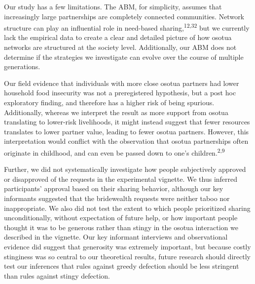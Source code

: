 \documentclass[
]{article}
\begin{document}
Our study has a few limitations. The ABM, for simplicity, assumes that increasingly large partnerships are completely connected communities. Network structure can play an influential role in need-based sharing,\textsuperscript{12,32} but we currently lack the empirical data to create a clear and detailed picture of how osotua networks are structured at the society level. Additionally, our ABM does not determine if the strategies we investigate can evolve over the course of multiple generations.

Our field evidence that individuals with more close osotua partners had lower household food insecurity was not a preregistered hypothesis, but a post hoc exploratory finding, and therefore has a higher risk of being spurious. Additionally, whereas we interpret the result as more support from osotua translating to lower-risk livelihoods, it might instead suggest that fewer resources translates to lower partner value, leading to fewer osotua partners. However, this interpretation would conflict with the observation that osotua partnerships often originate in childhood, and can even be passed down to one's children.\textsuperscript{2,9}

Further, we did not systematically investigate how people subjectively approved or disapproved of the requests in the experimental vignette. We thus inferred participants' approval based on their sharing behavior, although our key informants suggested that the bridewealth requests were neither taboo nor inappropriate. We also did not test the extent to which people prioritized sharing unconditionally, without expectation of future help, or how important people thought it was to be generous rather than stingy in the osotua interaction we described in the vignette. Our key informant interviews and observational evidence did suggest that generosity was extremely important, but because costly stinginess was so central to our theoretical results, future research should directly test our inferences that rules against greedy defection should be less stringent than rules against stingy defection.
\end{document}
